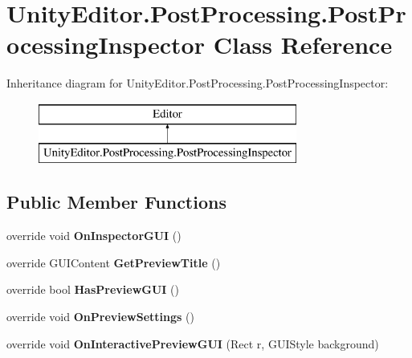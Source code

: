 \hypertarget{class_unity_editor_1_1_post_processing_1_1_post_processing_inspector}{}\section{Unity\+Editor.\+Post\+Processing.\+Post\+Processing\+Inspector Class Reference}
\label{class_unity_editor_1_1_post_processing_1_1_post_processing_inspector}
Inheritance diagram for Unity\+Editor.\+Post\+Processing.\+Post\+Processing\+Inspector\+:\begin{figure}[H]
\begin{center}
\leavevmode
\includegraphics[height=2.000000cm]{class_unity_editor_1_1_post_processing_1_1_post_processing_inspector}
\end{center}
\end{figure}
\subsection*{Public Member Functions}
\begin{DoxyCompactItemize}
\item 
\mbox{\label{class_unity_editor_1_1_post_processing_1_1_post_processing_inspector_a8fbf38f6c6365ae3a4905a077761ebcd}} 
override void {\bfseries On\+Inspector\+G\+UI} ()
\item 
\mbox{\label{class_unity_editor_1_1_post_processing_1_1_post_processing_inspector_a42ae8ca761c76f9b17ec24d81c18fd27}} 
override G\+U\+I\+Content {\bfseries Get\+Preview\+Title} ()
\item 
\mbox{\label{class_unity_editor_1_1_post_processing_1_1_post_processing_inspector_a18c9095836c4ebb4131e0e15f63b4b11}} 
override bool {\bfseries Has\+Preview\+G\+UI} ()
\item 
\mbox{\label{class_unity_editor_1_1_post_processing_1_1_post_processing_inspector_a1ef98fbdba8a625de358aac76370fdd6}} 
override void {\bfseries On\+Preview\+Settings} ()
\item 
\mbox{\label{class_unity_editor_1_1_post_processing_1_1_post_processing_inspector_a08cf912416a9603599f2837e298e3ce8}} 
override void {\bfseries On\+Interactive\+Preview\+G\+UI} (Rect r, G\+U\+I\+Style background)
\end{DoxyCompactItemize}
